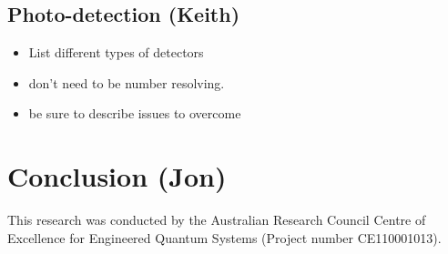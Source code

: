 \documentclass[aps,pra,twocolumn,amsmath,amssymb,nofootinbib,superscriptaddress]{revtex4}
\begin{document}
\subsection{Photo-detection (Keith)}

\begin{itemize}
\item List different types of detectors
\item don't need to be number resolving.
\item be sure to describe issues to overcome
\end{itemize}

\section{Conclusion (Jon)}

%
%

\begin{acknowledgments}
This research was conducted by the Australian Research Council Centre of Excellence for Engineered Quantum Systems (Project number CE110001013).
\end{acknowledgments}

%
%


\end{document}
